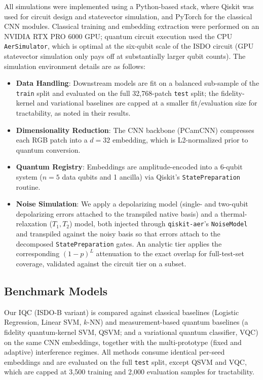 \documentclass[conference]{IEEEtran}
\begin{document}
All simulations were implemented using a Python-based stack, where Qiskit was used for circuit design and statevector simulation, and PyTorch for the classical CNN modules. Classical training and embedding extraction were performed on an NVIDIA RTX PRO 6000 GPU; quantum circuit execution used the CPU \texttt{AerSimulator}, which is optimal at the six-qubit scale of the ISDO circuit (GPU statevector simulation only pays off at substantially larger qubit counts). The simulation environment details are as follows:
\begin{itemize}
    \item \textbf{Data Handling}: Downstream models are fit on a balanced sub-sample of the \texttt{train} split and evaluated on the full 32{,}768-patch \texttt{test} split; the fidelity-kernel and variational baselines are capped at a smaller fit/evaluation size for tractability, as noted in their results.
    \item \textbf{Dimensionality Reduction}: The CNN backbone (PCamCNN) compresses each RGB patch into a $d=32$ embedding, which is L2-normalized prior to quantum conversion.
    \item \textbf{Quantum Registry}: Embeddings are amplitude-encoded into a 6-qubit system ($n=5$ data qubits and 1 ancilla) via Qiskit's \texttt{StatePreparation} routine.
    \item \textbf{Noise Simulation}: We apply a depolarizing model (single- and two-qubit depolarizing errors attached to the transpiled native basis) and a thermal-relaxation ($T_1, T_2$) model, both injected through \texttt{qiskit-aer}'s \texttt{NoiseModel} and transpiled against the noisy basis so that errors attach to the decomposed \texttt{StatePreparation} gates. An analytic tier applies the corresponding $(1-p)^L$ attenuation to the exact overlap for full-test-set coverage, validated against the circuit tier on a subset.
\end{itemize}

\subsection{Benchmark Models}
Our IQC (ISDO-B variant) is compared against classical baselines (Logistic Regression, Linear SVM, $k$-NN) and measurement-based quantum baselines (a fidelity quantum-kernel SVM, QSVM; and a variational quantum classifier, VQC) on the same CNN embeddings, together with the multi-prototype (fixed and adaptive) interference regimes. All methods consume identical per-seed embeddings and are evaluated on the full \texttt{test} split, except QSVM and VQC, which are capped at 3{,}500 training and 2{,}000 evaluation samples for tractability.
\end{document}
